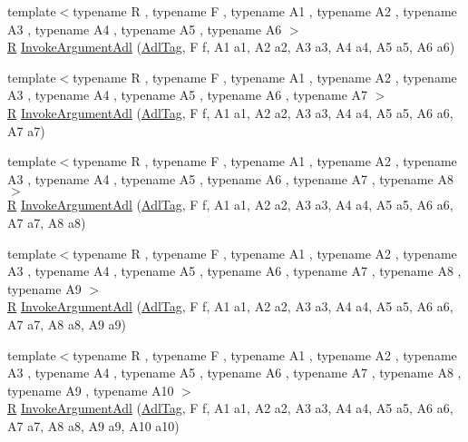 \begin{DoxyCompactItemize}
\item 
{\footnotesize template$<$typename R , typename F , typename A1 , typename A2 , typename A3 , typename A4 , typename A5 , typename A6 $>$ }\\\hyperlink{typedefs__9_8js_afb423b73ee7b6c04d2d54fc06e405404}{R} \hyperlink{namespacetesting_1_1internal_1_1invoke__argument_a16bf1b90d183210a82fbbef4e2eef1c5}{Invoke\+Argument\+Adl} (\hyperlink{structtesting_1_1internal_1_1invoke__argument_1_1_adl_tag}{Adl\+Tag}, F f, A1 a1, A2 a2, A3 a3, A4 a4, A5 a5, A6 a6)
\item 
{\footnotesize template$<$typename R , typename F , typename A1 , typename A2 , typename A3 , typename A4 , typename A5 , typename A6 , typename A7 $>$ }\\\hyperlink{typedefs__9_8js_afb423b73ee7b6c04d2d54fc06e405404}{R} \hyperlink{namespacetesting_1_1internal_1_1invoke__argument_a77f581ed8b270ed4752d49d5bdd59e84}{Invoke\+Argument\+Adl} (\hyperlink{structtesting_1_1internal_1_1invoke__argument_1_1_adl_tag}{Adl\+Tag}, F f, A1 a1, A2 a2, A3 a3, A4 a4, A5 a5, A6 a6, A7 a7)
\item 
{\footnotesize template$<$typename R , typename F , typename A1 , typename A2 , typename A3 , typename A4 , typename A5 , typename A6 , typename A7 , typename A8 $>$ }\\\hyperlink{typedefs__9_8js_afb423b73ee7b6c04d2d54fc06e405404}{R} \hyperlink{namespacetesting_1_1internal_1_1invoke__argument_a43c35b90896110940a0cc41c337ca306}{Invoke\+Argument\+Adl} (\hyperlink{structtesting_1_1internal_1_1invoke__argument_1_1_adl_tag}{Adl\+Tag}, F f, A1 a1, A2 a2, A3 a3, A4 a4, A5 a5, A6 a6, A7 a7, A8 a8)
\item 
{\footnotesize template$<$typename R , typename F , typename A1 , typename A2 , typename A3 , typename A4 , typename A5 , typename A6 , typename A7 , typename A8 , typename A9 $>$ }\\\hyperlink{typedefs__9_8js_afb423b73ee7b6c04d2d54fc06e405404}{R} \hyperlink{namespacetesting_1_1internal_1_1invoke__argument_a6e204965286414aac5113286eb5c8996}{Invoke\+Argument\+Adl} (\hyperlink{structtesting_1_1internal_1_1invoke__argument_1_1_adl_tag}{Adl\+Tag}, F f, A1 a1, A2 a2, A3 a3, A4 a4, A5 a5, A6 a6, A7 a7, A8 a8, A9 a9)
\item 
{\footnotesize template$<$typename R , typename F , typename A1 , typename A2 , typename A3 , typename A4 , typename A5 , typename A6 , typename A7 , typename A8 , typename A9 , typename A10 $>$ }\\\hyperlink{typedefs__9_8js_afb423b73ee7b6c04d2d54fc06e405404}{R} \hyperlink{namespacetesting_1_1internal_1_1invoke__argument_abd36164191a3e386c50243074854b272}{Invoke\+Argument\+Adl} (\hyperlink{structtesting_1_1internal_1_1invoke__argument_1_1_adl_tag}{Adl\+Tag}, F f, A1 a1, A2 a2, A3 a3, A4 a4, A5 a5, A6 a6, A7 a7, A8 a8, A9 a9, A10 a10)
\end{DoxyCompactItemize}


